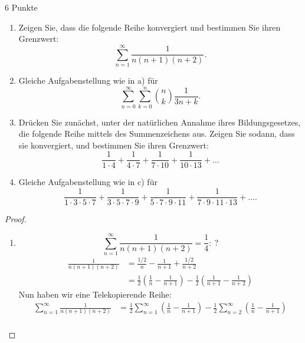 \documentclass{problemset}
\author{Michael van Straten}
\begin{document}
\maketitle

\begin{problem}{6 Punkte}
\begin{enumerate}
    \item Zeigen Sie, dass die folgende Reihe konvergiert und bestimmen Sie
          ihren Grenzwert:
          \[
              \sum_{n=1}^{\infty} \frac{1}{n(n + 1)(n + 2)}.
          \]
    \item Gleiche Aufgabenstellung wie in a) für
          \[
              \sum_{n=0}^{\infty} \sum_{k=0}^{n} {n \choose k} \frac{1}{3n+k}.
          \]
    \item Drücken Sie zunächst, unter der natürlichen Annahme ihres
          Bildungsgesetzes, die folgende Reihe mittels des Summenzeichens aus.
          Zeigen Sie sodann, dass sie konvergiert, und bestimmen Sie ihren
          Grenzwert:
          \[
              \frac{1}{1 \cdot 4 } + \frac{1}{4 \cdot 7 } + \frac{1}{7 \cdot 10} + \frac{1}{10 \cdot 13} + \ldots
          \]
    \item Gleiche Aufgabenstellung wie in c) für
          \[
              \frac{1}{1 \cdot 3 \cdot 5 \cdot 7 } + \frac{1}{3 \cdot 5 \cdot 7 \cdot 9} + \frac{1}{5 \cdot 7 \cdot 9 \cdot 11} + \frac{1}{7 \cdot 9 \cdot 11 \cdot 13} + \ldots.
          \]
\end{enumerate}
\begin{proof}
    \begin{enumerate}
        \item
              \[
                  \sum_{n = 1}^{\infty}\frac{1}{n(n + 1)(n + 2)} = \frac{1}{4}:\ ?
              \]
              \begin{align}
                  \frac{1}{n(n + 1)(n + 2)} & = \frac{1/2}{n} - \frac{1}{n + 1} + \frac{1/2}{n + 2}                                                               \\
                                            & = \frac{1}{2}\left(\frac{1}{n} - \frac{1}{n + 1}\right) - \frac{1}{2}\left(\frac{1}{n + 1} - \frac{1}{n + 2}\right)
              \end{align}
              Nun haben wir eine Telekopierende Reihe:
              \begin{align}
                  \sum_{n = 1}^{\infty}\frac{1}{n(n + 1)(n + 2)} & = \frac{1}{2}\sum_{n = 1}^{\infty}\left(\frac{1}{n} - \frac{1}{n + 1}\right) - \frac{1}{2}\sum_{n = 2}^{\infty}\left(\frac{1}{n} - \frac{1}{n + 1}\right) \\

\end{align}
\end{enumerate}
\end{proof}
\end{problem}
\end{document}
